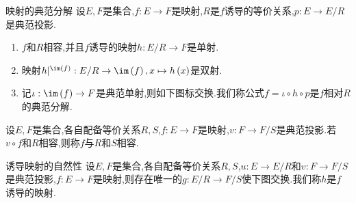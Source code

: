 \begin{proposition}{映射的典范分解}{}
	设$E,F$是集合,$f:E\to F$是映射,$R$是$f$诱导的等价关系,$p:E\to E/R$是典范投影.
	\begin{enumerate}
		\item $f$和$R$相容,并且$f$诱导的映射$h:E/R\to F$是单射.
		\item 映射$h|^{\im\left(f\right)}:E/R\to\im\left(f\right),x\mapsto h\left(x\right)$是双射.
		\item 记$\iota:\im\left(f\right)\to F$是典范单射,则如下图标交换.我们称公式$f=\iota\circ h\circ p$是$f$相对$R$的典范分解.
		\begin{center}
		\end{center}
	\end{enumerate}
\end{proposition}

\begin{definition}{}{}
	设$E,F$是集合,各自配备等价关系$R,S$,$f:E\to F$是映射,$v:F\to F/S$是典范投影.若$v\circ f$和$R$相容,则称$f$与$R$和$S$相容.
\end{definition}

\begin{proposition}{诱导映射的自然性}{}
	设$E,F$是集合,各自配备等价关系$R,S$,$u:E\to E/R$和$v:F\to F/S$是典范投影,$f:E\to F$是映射,则存在唯一的$g:E/R\to F/S$使下图交换.我们称$h$是$f$诱导的映射.
	\begin{center}
	\end{center}
\end{proposition}



























